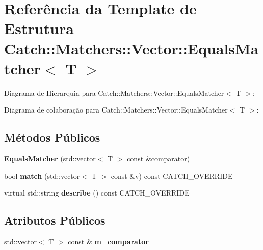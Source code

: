 \hypertarget{structCatch_1_1Matchers_1_1Vector_1_1EqualsMatcher}{}\section{Referência da Template de Estrutura Catch\+:\+:Matchers\+:\+:Vector\+:\+:Equals\+Matcher$<$ T $>$}
\label{structCatch_1_1Matchers_1_1Vector_1_1EqualsMatcher}


Diagrama de Hierarquia para Catch\+:\+:Matchers\+:\+:Vector\+:\+:Equals\+Matcher$<$ T $>$\+:


Diagrama de colaboração para Catch\+:\+:Matchers\+:\+:Vector\+:\+:Equals\+Matcher$<$ T $>$\+:
\subsection*{Métodos Públicos}
\begin{DoxyCompactItemize}
\item 
{\bfseries Equals\+Matcher} (std\+::vector$<$ T $>$ const \&comparator)\hypertarget{structCatch_1_1Matchers_1_1Vector_1_1EqualsMatcher_a3846c47780d1991dcfe87aefded98008}{}\label{structCatch_1_1Matchers_1_1Vector_1_1EqualsMatcher_a3846c47780d1991dcfe87aefded98008}

\item 
bool {\bfseries match} (std\+::vector$<$ T $>$ const \&v) const C\+A\+T\+C\+H\+\_\+\+O\+V\+E\+R\+R\+I\+DE\hypertarget{structCatch_1_1Matchers_1_1Vector_1_1EqualsMatcher_aca444c319d1b4c6f538faf9c4735da04}{}\label{structCatch_1_1Matchers_1_1Vector_1_1EqualsMatcher_aca444c319d1b4c6f538faf9c4735da04}

\item 
virtual std\+::string {\bfseries describe} () const C\+A\+T\+C\+H\+\_\+\+O\+V\+E\+R\+R\+I\+DE\hypertarget{structCatch_1_1Matchers_1_1Vector_1_1EqualsMatcher_aca79ade26f4a75b2a57005067e086e35}{}\label{structCatch_1_1Matchers_1_1Vector_1_1EqualsMatcher_aca79ade26f4a75b2a57005067e086e35}

\end{DoxyCompactItemize}
\subsection*{Atributos Públicos}
\begin{DoxyCompactItemize}
\item 
std\+::vector$<$ T $>$ const \& {\bfseries m\+\_\+comparator}\hypertarget{structCatch_1_1Matchers_1_1Vector_1_1EqualsMatcher_a56f7aa6f110a12b1b9aeb0cabbc9d755}{}\label{structCatch_1_1Matchers_1_1Vector_1_1EqualsMatcher_a56f7aa6f110a12b1b9aeb0cabbc9d755}

\end{DoxyCompactItemize}


